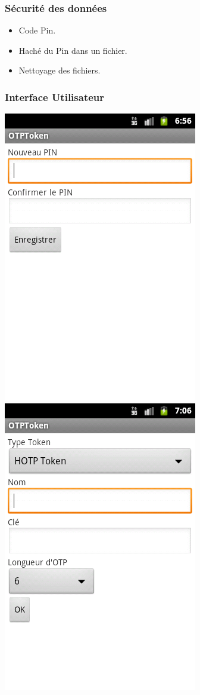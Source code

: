 \documentclass[xcolor=table]{beamer}
\begin{document}
\begin{frame}
\frametitle{Sécurité des données}
\begin{itemize}
\item Code Pin.
\item Haché du Pin dans un fichier.
\item Nettoyage des fichiers.
\end{itemize}
\end{frame}

\begin{frame}
\frametitle{Interface Utilisateur}
\includegraphics[scale=0.33]{../graphics/enterpin.png}
\hspace{1em}
\includegraphics[scale=0.33]{../graphics/firstotp.png}

\end{frame}
\end{document}

